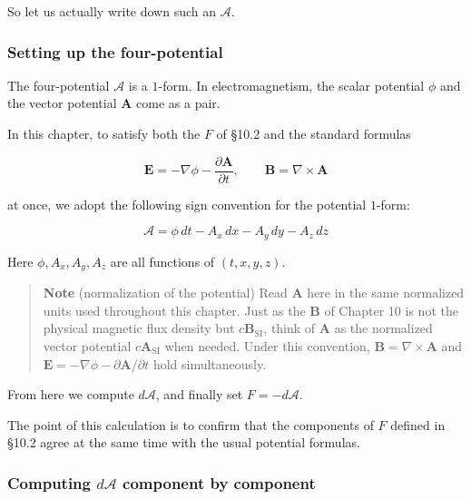 So let us actually write down such an \(\mathcal{A}\).

\hypertarget{setting-up-the-four-potential}{%
\subsubsection{Setting up the
four-potential}\label{setting-up-the-four-potential}}

The four-potential \(\mathcal{A}\) is a \(1\)-form. In electromagnetism,
the scalar potential \(\phi\) and the vector potential \(\mathbf{A}\)
come as a pair.

In this chapter, to satisfy both the \(F\) of §10.2 and the standard
formulas

\[
\mathbf{E}
=
-\nabla\phi
-
\frac{\partial\mathbf{A}}{\partial t},
\qquad
\mathbf{B}
=
\nabla\times\mathbf{A}
\]

at once, we adopt the following sign convention for the potential
\(1\)-form:

\[
\mathcal{A}
=
\phi\,dt
-
A_x\,dx
-
A_y\,dy
-
A_z\,dz
\]

Here \(\phi,A_x,A_y,A_z\) are all functions of \((t,x,y,z)\).

\begin{quote}
\textbf{Note} (normalization of the potential) Read \(\mathbf{A}\) here
in the same normalized units used throughout this chapter. Just as the
\(\mathbf{B}\) of Chapter 10 is not the physical magnetic flux density
but \(c\mathbf{B}_{\mathrm{SI}}\), think of \(\mathbf{A}\) as the
normalized vector potential \(c\mathbf{A}_{\mathrm{SI}}\) when needed.
Under this convention, \(\mathbf{B}=\nabla\times\mathbf{A}\) and
\(\mathbf{E}=-\nabla\phi-\partial\mathbf{A}/\partial t\) hold
simultaneously.
\end{quote}

From here we compute \(d\mathcal{A}\), and finally set
\(F=-d\mathcal{A}\).

The point of this calculation is to confirm that the components of \(F\)
defined in §10.2 agree at the same time with the usual potential
formulas.

\hypertarget{computing-dmathcala-component-by-component}{%
\subsubsection{\texorpdfstring{Computing \(d\mathcal{A}\) component by
component}{Computing d\textbackslash mathcal\{A\} component by component}}\label{computing-dmathcala-component-by-component}}


